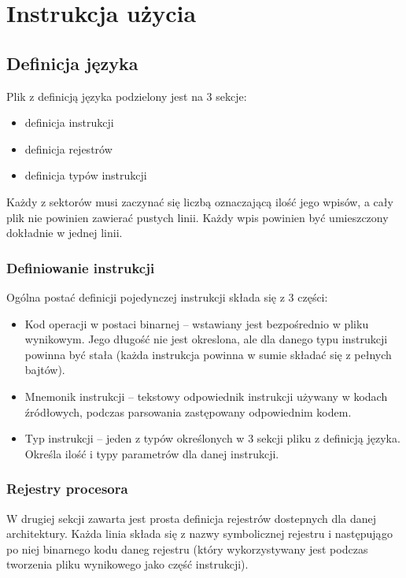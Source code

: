 \documentclass[a4paper,12pt]{report}
\begin{document}
\section{Instrukcja użycia}

\subsection{Definicja języka}

Plik z definicją języka podzielony jest na 3 sekcje:
\begin{itemize}
  \item definicja instrukcji
  \item definicja rejestrów
  \item definicja typów instrukcji
\end{itemize}

Każdy z sektorów musi zaczynać się liczbą oznaczającą ilość jego wpisów, a cały plik nie powinien zawierać pustych linii. Każdy wpis powinien być umieszczony dokładnie w jednej linii.

\subsubsection{Definiowanie instrukcji}
Ogólna postać definicji pojedynczej instrukcji składa się z 3 części:
\begin{itemize}
  \item Kod operacji w postaci binarnej -- wstawiany jest bezpośrednio w pliku wynikowym. Jego długość nie jest okreslona, ale dla danego typu instrukcji powinna być stała (każda instrukcja powinna w sumie składać się z pełnych bajtów).
  \item Mnemonik instrukcji -- tekstowy odpowiednik instrukcji używany w kodach źródłowych, podczas parsowania zastępowany odpowiednim kodem.
  \item Typ instrukcji -- jeden z typów określonych w 3 sekcji pliku z definicją języka. Określa ilość i typy parametrów dla danej instrukcji.
\end{itemize}

\subsubsection{Rejestry procesora}

W drugiej sekcji zawarta jest prosta definicja rejestrów dostepnych dla danej architektury. Każda linia składa się z nazwy symbolicznej rejestru i następujągo po niej binarnego kodu daneg rejestru (który wykorzystywany jest podczas tworzenia pliku wynikowego jako część instrukcji).
\end{document}
